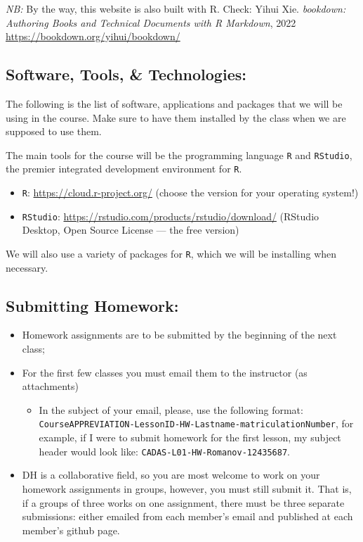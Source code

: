 \documentclass[
]{book}
\providecommand{\tightlist}{%
  \setlength{\itemsep}{0pt}\setlength{\parskip}{0pt}}
\begin{document}
\emph{NB:} By the way, this website is also built with R. Check: Yihui Xie. \emph{bookdown: Authoring Books and Technical Documents with R Markdown}, 2022 \url{https://bookdown.org/yihui/bookdown/}

\hypertarget{software-tools-technologies}{%
\subsection*{Software, Tools, \& Technologies:}\label{software-tools-technologies}}

The following is the list of software, applications and packages that we will be using in the course. Make sure to have them installed by the class when we are supposed to use them.

The main tools for the course will be the programming language \texttt{R} and \texttt{RStudio}, the premier integrated development environment for \texttt{R}.

\begin{itemize}
\tightlist
\item
  \texttt{R}: \url{https://cloud.r-project.org/} (choose the version for your operating system!)
\item
  \texttt{RStudio}: \url{https://rstudio.com/products/rstudio/download/} (RStudio Desktop, Open Source License --- the free version)
\end{itemize}

We will also use a variety of packages for \texttt{R}, which we will be installing when necessary.

\hypertarget{submitting-homework}{%
\subsection*{Submitting Homework:}\label{submitting-homework}}

\begin{itemize}
\tightlist
\item
  Homework assignments are to be submitted by the beginning of the next class;
\item
  For the first few classes you must email them to the instructor (as attachments)

  \begin{itemize}
  \tightlist
  \item
    In the subject of your email, please, use the following format: \texttt{CourseAPPREVIATION-LessonID-HW-Lastname-matriculationNumber}, for example, if I were to submit homework for the first lesson, my subject header would look like: \texttt{CADAS-L01-HW-Romanov-12435687}.
  \end{itemize}
\item
  DH is a collaborative field, so you are most welcome to work on your homework assignments in groups, however, you must still submit it. That is, if a groups of three works on one assignment, there must be three separate submissions: either emailed from each member's email and published at each member's github page.
\end{itemize}
\end{document}

